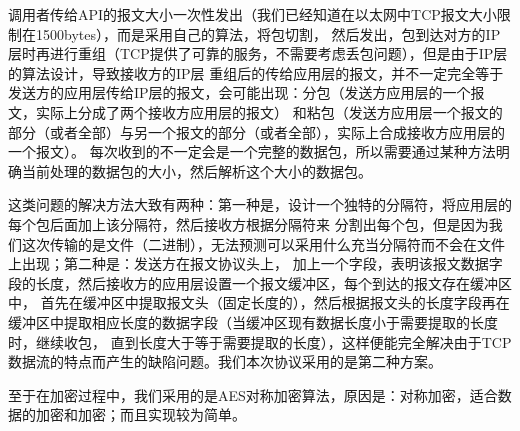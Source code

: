 \documentclass[15pt]{ctexart}
\begin{document}
调用者传给API的报文大小一次性发出（我们已经知道在以太网中TCP报文大小限制在1500bytes），而是采用自己的算法，将包切割，
然后发出，包到达对方的IP层时再进行重组（TCP提供了可靠的服务，不需要考虑丢包问题），但是由于IP层的算法设计，导致接收方的IP层
重组后的传给应用层的报文，并不一定完全等于发送方的应用层传给IP层的报文，会可能出现：分包（发送方应用层的一个报文，实际上分成了两个接收方应用层的报文）
和粘包（发送方应用层一个报文的部分（或者全部）与另一个报文的部分（或者全部），实际上合成接收方应用层的一个报文）。
每次收到的不一定会是一个完整的数据包，所以需要通过某种方法明确当前处理的数据包的大小，然后解析这个大小的数据包。
\par 这类问题的解决方法大致有两种：第一种是，设计一个独特的分隔符，将应用层的每个包后面加上该分隔符，然后接收方根据分隔符来
分割出每个包，但是因为我们这次传输的是文件（二进制），无法预测可以采用什么充当分隔符而不会在文件上出现；第二种是：发送方在报文协议头上，
加上一个字段，表明该报文数据字段的长度，然后接收方的应用层设置一个报文缓冲区，每个到达的报文存在缓冲区中，
首先在缓冲区中提取报文头（固定长度的），然后根据报文头的长度字段再在缓冲区中提取相应长度的数据字段（当缓冲区现有数据长度小于需要提取的长度时，继续收包，
直到长度大于等于需要提取的长度），这样便能完全解决由于TCP数据流的特点而产生的缺陷问题。我们本次协议采用的是第二种方案。
\par 至于在加密过程中，我们采用的是AES对称加密算法，原因是：对称加密，适合数据的加密和加密；而且实现较为简单。
\end{document}
